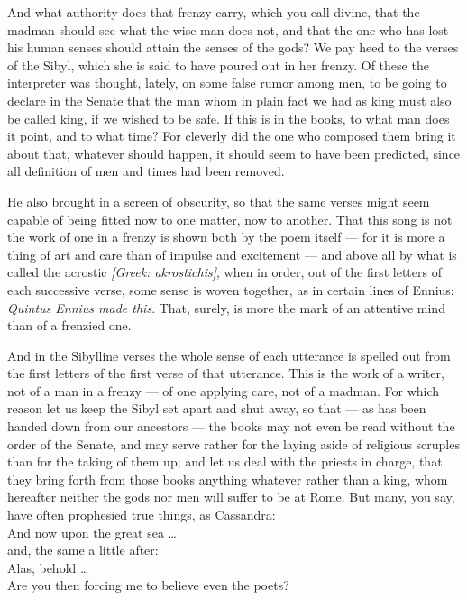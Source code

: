  And what authority does that frenzy carry, which you call divine, that the madman should see what the wise man does not, and that the one who has lost his human senses should attain the senses of the gods? We pay heed to the verses of the Sibyl, which she is said to have poured out in her frenzy. Of these the interpreter was thought, lately, on some false rumor among men, to be going to declare in the Senate that the man whom in plain fact we had as king must also be called king, if we wished to be safe. If this is in the books, to what man does it point, and to what time? For cleverly did the one who composed them bring it about that, whatever should happen, it should seem to have been predicted, since all definition of men and times had been removed.

 He also brought in a screen of obscurity, so that the same verses might seem capable of being fitted now to one matter, now to another. That this song is not the work of one in a frenzy is shown both by the poem itself — for it is more a thing of art and care than of impulse and excitement — and above all by what is called the acrostic \textit{[Greek: akrostichis]}, when in order, out of the first letters of each successive verse, some sense is woven together, as in certain lines of Ennius: \emph{Quintus Ennius made this}. That, surely, is more the mark of an attentive mind than of a frenzied one.

 And in the Sibylline verses the whole sense of each utterance is spelled out from the first letters of the first verse of that utterance. This is the work of a writer, not of a man in a frenzy — of one applying care, not of a madman. For which reason let us keep the Sibyl set apart and shut away, so that — as has been handed down from our ancestors — the books may not even be read without the order of the Senate, and may serve rather for the laying aside of religious scruples than for the taking of them up; and let us deal with the priests in charge, that they bring forth from those books anything whatever rather than a king, whom hereafter neither the gods nor men will suffer to be at Rome. But many, you say, have often prophesied true things, as Cassandra: \\ And now upon the great sea \dots \\ and, the same a little after: \\ Alas, behold \dots \\ Are you then forcing me to believe even the poets?

